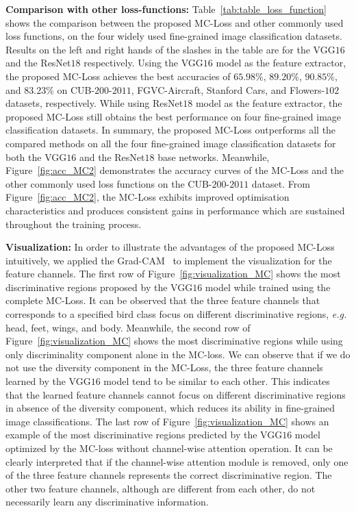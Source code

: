 \documentclass[journal]{IEEEtran}
\begin{document}
\noindent \textbf{Comparison with other loss-functions:} Table~\ref{tab:table_loss_function} shows the comparison between the proposed MC-Loss and other commonly used loss functions, on the  four widely used fine-grained image classification datasets. Results on the left and right hands of the slashes in the table are for the VGG$16$ and  the ResNet$18$ respectively. Using the VGG$16$ model as the feature extractor, the proposed MC-Loss achieves the best accuracies of $65.98\%$, $89.20\%$, $90.85\%$, and $83.23\%$ on CUB-$200$-$2011$, FGVC-Aircraft, Stanford Cars, and Flowers-$102$ datasets, respectively. While using ResNet$18$ model as the feature extractor, the proposed MC-Loss still obtains the best performance on four fine-grained image classification datasets. In summary, the proposed MC-Loss outperforms all the compared methods on all the four fine-grained image classification datasets for both the VGG$16$ and the ResNet$18$ base networks. 
{Meanwhile, Figure~\ref{fig:acc_MC2} demonstrates the accuracy curves of the MC-Loss and the  other commonly used loss functions on the CUB-$200$-$2011$ dataset. 
From  Figure~\ref{fig:acc_MC2}, the MC-Loss exhibits improved optimisation characteristics and produces consistent gains in performance which are sustained throughout the training process.}







\noindent \textbf{Visualization:} In order to illustrate the advantages of the proposed MC-Loss intuitively, we applied the Grad-CAM~\cite{selvaraju2017grad} to implement the visualization for the feature channels. The first row of Figure~\ref{fig:visualization_MC} shows the most discriminative regions proposed by the  VGG$16$ model while trained using the complete MC-Loss. It can be observed that the three feature channels that corresponds to a specified bird class focus on different discriminative regions, \emph{e.g.} head, feet, wings, and body. Meanwhile, the second row of Figure~\ref{fig:visualization_MC} shows the most discriminative regions while using only discriminality component alone in the MC-loss. We can observe  that if we do not use the diversity component in the MC-Loss, the three feature channels learned by the VGG$16$  model tend to be similar to each other. This indicates that the learned feature channels cannot focus on different discriminative regions in absence of the diversity component, which reduces its ability in fine-grained image classifications. The last row of Figure~\ref{fig:visualization_MC} shows an example of the most discriminative regions predicted by the VGG$16$ model optimized by the MC-loss without channel-wise attention operation. It can be clearly interpreted that if the channel-wise attention module is removed, only one of the three feature channels represents the correct discriminative region. The other two feature channels, although are different from each other, do not necessarily learn any discriminative information. 
\end{document}
